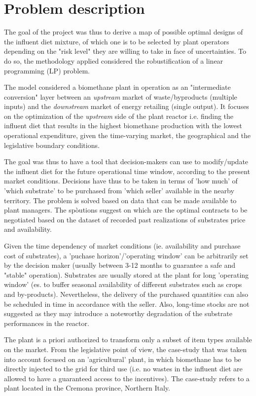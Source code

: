 \section{Problem description}

The goal of the project was thus to derive a map of possible optimal designs of the influent diet mixture, of which one is to be selected by plant operators depending on the "risk level" they are willing to take in face of uncertainties.
To do so, the methodology applied considered the robustification of a linear programming (LP) problem.

The model considered a biomethane plant in operation as an "intermediate conversion" layer between an \emph{upstream} market of waste/byproducts (multiple inputs) and the \emph{downstream} market of energy retailing (single output).
It focuses on the optimization of the \emph{upstream} side of the plant reactor i.e. finding the influent diet that results in the highest biomethane production with the lowest operational expenditure, given the time-varying market, the geographical and the legislative boundary conditions. 

The goal was thus to have a tool that decision-makers can use to modify/update the influent diet for the future operational time window, according to the present market conditions.
Decisions have thus to be taken in terms of 'how much' of 'which substrate' to be purchased from 'which seller' available in the nearby territory.
The problem is solved based on data that can be made available to plant managers. The spòutions suggest on which are the optimal contracts to be negotiated based on the dataset of recorded past realizations of substrates price and availability.

Given the time dependency of market conditions (ie. availability and purchase cost of substrates), a 'puchase horizon'/'operating window' can be arbitrarily set by the decision maker (usually between 3-12 months to guarantee a safe and "stable" operation).
Substrates are usually stored at the plant for long 'operating window' (es. to buffer seasonal availability of different substrates such as crops and by-products). Nevertheless, the delivery of the purchased quantities can also be scheduled in time in accordance with the seller. Also, long-time stocks are not suggested as they may introduce a noteworthy degradation of the substrate performances in the reactor.

The plant is a priori authorized to transform only a subset of item types available on the market. From the legislative point of view, the case-study that was taken into account focused on an 'agricultural' plant, in which biomethane has to be directly injected to the grid for third use (i.e. no wastes in the influent diet are allowed to have a guaranteed access to the incentives).
The case-study refers to a plant located in the Cremona province, Northern Italy.

